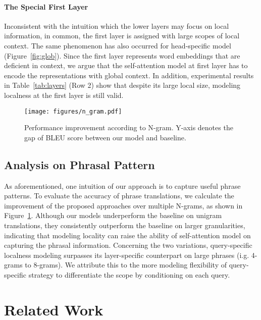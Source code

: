 \documentclass[11pt,a4paper]{article}
\begin{document}
\paragraph{The Special First Layer} 
Inconsistent with the intuition which the lower layers may focus on local information, in common, the first layer is assigned with large scopes of local context. The same phenomenon has also occurred for head-specific model (Figure~\ref{fig:glob}).
Since the first layer represents word embeddings that are deficient in context, we argue that the self-attention model at first layer has to encode the representations with global context. In addition, experimental results in Table~\ref{tab:layers} (Row 2) show that despite its large local size, modeling localness at the first layer is still valid. 

 \begin{figure}[t]
\begin{center}
\texttt{[image: figures/n\_gram.pdf]}
\caption{Performance improvement according to N-gram. Y-axis denotes the gap of BLEU score between our model and baseline.}
\label{fig:ana}
\end{center}
\end{figure}


\subsection{Analysis on Phrasal Pattern}
\label{sec:pattern}

As aforementioned, one intuition of our approach is to capture useful phrase patterns. To evaluate the accuracy of phrase translations, we calculate the improvement of the proposed approaches over multiple N-grams, as shown in Figure~\ref{fig:ana}.
Although our models underperform the baseline on unigram translations, they consistently outperform the baseline on larger granularities, indicating that modeling locality can raise the ability of self-attention model on capturing the phrasal information.
Concerning the two variations, query-specific localness modeling surpasses its layer-specific counterpart on large phrases (i.g. 4-grams to 8-grams). We attribute this to the more modeling flexibility of query-specific strategy to differentiate the scope by conditioning on each query.



 





\section{Related Work}
\end{document}

